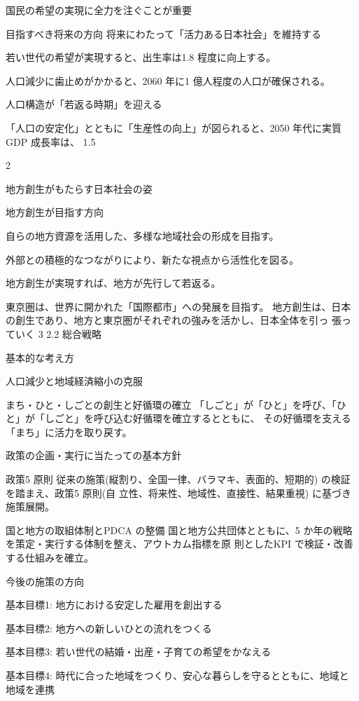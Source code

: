 \item 国民の希望の実現に全力を注ぐことが重要
\item 目指すべき将来の方向
将来にわたって「活力ある日本社会」を維持する
\item 若い世代の希望が実現すると、出生率は1.8 程度に向上する。
\item 人口減少に歯止めがかかると、2060 年に1 億人程度の人口が確保される。
\item 人口構造が「若返る時期」を迎える
\item 「人口の安定化」とともに「生産性の向上」が図られると、2050 年代に実質GDP 成長率は、
1.5\item2%
\item 地方創生がもたらす日本社会の姿
\item 地方創生が目指す方向
\item 自らの地方資源を活用した、多様な地域社会の形成を目指す。
\item 外部との積極的なつながりにより、新たな視点から活性化を図る。
\item 地方創生が実現すれば、地方が先行して若返る。
\item 東京圏は、世界に開かれた「国際都市」への発展を目指す。
地方創生は、日本の創生であり、地方と東京圏がそれぞれの強みを活かし、日本全体を引っ
張っていく
3
2.2 総合戦略
\item 基本的な考え方
\item 人口減少と地域経済縮小の克服
\item まち・ひと・しごとの創生と好循環の確立
「しごと」が「ひと」を呼び、「ひと」が「しごと」を呼び込む好循環を確立するとともに、
その好循環を支える「まち」に活力を取り戻す。
\item 政策の企画・実行に当たっての基本方針
\item 政策5 原則
従来の施策(縦割り、全国一律、バラマキ、表面的、短期的) の検証を踏まえ、政策5 原則(自
立性、将来性、地域性、直接性、結果重視) に基づき施策展開。
\item 国と地方の取組体制とPDCA の整備
国と地方公共団体とともに、5 か年の戦略を策定・実行する体制を整え、アウトカム指標を原
則としたKPI で検証・改善する仕組みを確立。
\item 今後の施策の方向
\item 基本目標1: 地方における安定した雇用を創出する
\item 基本目標2: 地方への新しいひとの流れをつくる
\item 基本目標3: 若い世代の結婚・出産・子育ての希望をかなえる
\item 基本目標4: 時代に合った地域をつくり、安心な暮らしを守るとともに、地域と地域を連携
